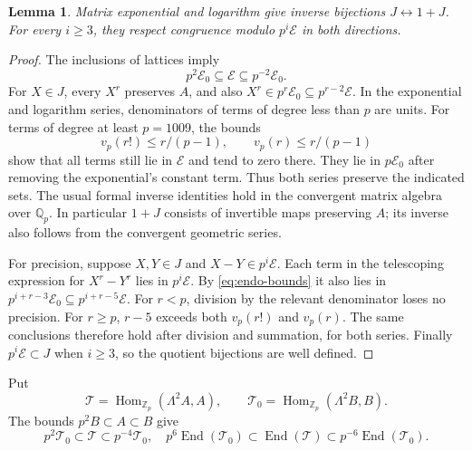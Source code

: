 \documentclass[11pt]{article}
\newtheorem{lemma}[theorem]{Lemma}
\theoremstyle{definition}\newtheorem{definition}[theorem]{Definition}
\theoremstyle{remark}\newtheorem{remark}[theorem]{Remark}
\DeclareMathOperator{\End}{End}
\DeclareMathOperator{\Hom}{Hom}
\newcommand{\Zp}{\mathbb Z_p}
\newcommand{\Qp}{\mathbb Q_p}
\newcommand{\EE}{\mathcal E}
\newcommand{\TT}{\mathcal T}
\begin{document}
\begin{lemma}\label{lem:logexp}
Matrix exponential and logarithm give inverse bijections
$J\leftrightarrow1+J$. For every $i\ge3$, they respect congruence modulo
$p^i\EE$ in both directions.
\end{lemma}
\begin{proof}
The inclusions of lattices imply
\begin{equation}\label{eq:endo-bounds}
 p^2\EE_0\subseteq\EE\subseteq p^{-2}\EE_0.
\end{equation}
For $X\in J$, every $X^r$ preserves $A$, and also
$X^r\in p^r\EE_0\subseteq p^{r-2}\EE$.
In the exponential and logarithm series, denominators of terms of degree
less than $p$ are units. For terms of degree at least $p=1009$, the bounds
\[
 v_p(r!)\le r/(p-1),\qquad v_p(r)\le r/(p-1)
\]
show that all terms still lie in $\EE$ and tend to zero there.
They lie in $p\EE_0$ after removing the exponential's constant term.
Thus both series preserve the indicated sets. The usual formal inverse
identities hold in the convergent matrix algebra over $\Qp$.
In particular $1+J$ consists of invertible maps preserving $A$; its inverse
also follows from the convergent geometric series.

For precision, suppose $X,Y\in J$ and $X-Y\in p^i\EE$.
Each term in the telescoping expression for $X^r-Y^r$ lies in $p^i\EE$.
By \eqref{eq:endo-bounds} it also lies in
$p^{i+r-3}\EE_0\subseteq p^{i+r-5}\EE$.
For $r<p$, division by the relevant denominator loses no precision.
For $r\ge p$, $r-5$ exceeds both $v_p(r!)$ and $v_p(r)$.
The same conclusions therefore hold after division and summation, for
both series. Finally $p^i\EE\subset J$ when $i\ge3$, so the quotient
bijections are well defined.
\end{proof}

Put
\[
 \TT=\Hom_{\Zp}(\Lambda^2A,A),\qquad
 \TT_0=\Hom_{\Zp}(\Lambda^2B,B).
\]
The bounds $p^2B\subset A\subset B$ give
\begin{equation}\label{eq:tensor-bounds}
 p^2\TT_0\subset\TT\subset p^{-4}\TT_0,
 \quad
 p^6\End(\TT_0)\subset\End(\TT)\subset p^{-6}\End(\TT_0).
\end{equation}
\end{document}
